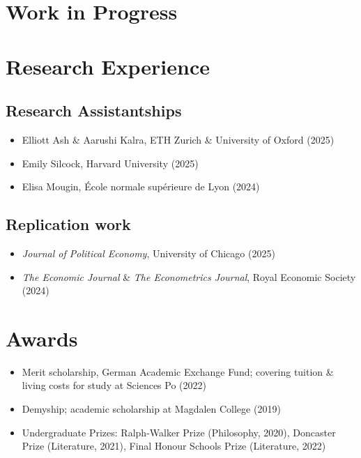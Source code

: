 \documentclass{cv_style}
\begin{document}
    \section{Work in Progress}
		\begin{etaremune}[leftmargin=13pt, topsep=3pt,itemsep=3pt,partopsep=0pt,parsep=0pt]
					\item {}
		\end{etaremune}
        
	\section{Research Experience}
        \subsection{Research Assistantships}
            \begin{itemize}
                \item Elliott Ash \& Aarushi Kalra, ETH Zurich \& University of Oxford (2025\textendash)
                \item Emily Silcock, Harvard University (2025\textendash)
                \item Elisa Mougin, École normale supérieure de Lyon (2024)
            \end{itemize}
        
        \subsection{Replication work}
            \begin{itemize}
                \item \textit{Journal of Political Economy}, University of Chicago (2025\textendash)
                \item \textit{The Economic Journal} \& \textit{The Econometrics Journal}, Royal Economic Society (2024)
            \end{itemize}
		
	\section{Awards}
		\begin{itemize}
            \item Merit scholarship, German Academic Exchange Fund; covering tuition \& living costs for study at Sciences Po (2022)
            \item Demyship; academic scholarship at Magdalen College (2019)
            \item Undergraduate Prizes: Ralph-Walker Prize (Philosophy, 2020), Doncaster Prize (Literature, 2021), Final Honour Schools Prize (Literature, 2022)
		\end{itemize}
\end{document}
